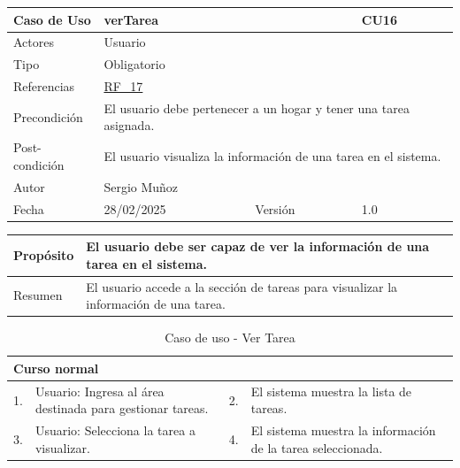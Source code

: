 \newpage

\begin{table}[H]
    \centering
    \begin{tabular}{| m{} | m{} | m{} | m{} |}
        \hline
        \rowcolor[HTML]{C0C0C0} Caso de Uso & \multicolumn{2}{|m{0.43\textwidth}|}{verTarea} &  CU16\\ 
        \hline
        Actores & \multicolumn{3}{l|}{Usuario} \\ 
        \hline
        Tipo & \multicolumn{3}{l|}{Obligatorio} \\ 
        \hline
        Referencias & \multicolumn{3}{l|}{\hyperref[req:RF17]{RF\_17}} \\ 
        \hline
        Precondición & \multicolumn{3}{m{0.67\textwidth}|}{El usuario debe pertenecer a un hogar y tener una tarea asignada.} \\ 
        \hline
        Post-condición & \multicolumn{3}{m{0.67\textwidth}|}{El usuario visualiza la información de una tarea en el sistema.} \\ 
        \hline
        Autor & \multicolumn{3}{l|}{Sergio Muñoz} \\ 
        \hline
        Fecha & 28/02/2025 & Versión & 1.0 \\ 
        \hline
    \end{tabular}
\end{table}

\begin{table}[H]
    \centering
    \begin{tabular}{| m{} | m{} | m{} | m{} |}
        \hline
        Propósito & \multicolumn{3}{m{0.67\textwidth}|}{El usuario debe ser capaz de ver la información de una tarea en el sistema.} \\ 
        \hline
        Resumen & \multicolumn{3}{m{0.67\textwidth}|}{El usuario accede a la sección de tareas para visualizar la información de una tarea.} \\ 
        \hline
    \end{tabular}
\end{table}

\begin{table}[H]
    \centering
    \begin{tabular}{| m{} | m{} | m{} | m{} |}
        \hline
        \multicolumn{4}{|m{0.9\textwidth}|}{Curso normal} \\ 
        \hline
        1. & Usuario: Ingresa al área destinada para gestionar tareas.
        & 2. & El sistema muestra la lista de tareas. \\ 
        \hline
        3. & Usuario: Selecciona la tarea a visualizar. 
        & 4. & El sistema muestra la información de la tarea seleccionada. \\ 
        \hline
    \end{tabular}
    \caption{Caso de uso - Ver Tarea}
\end{table}

